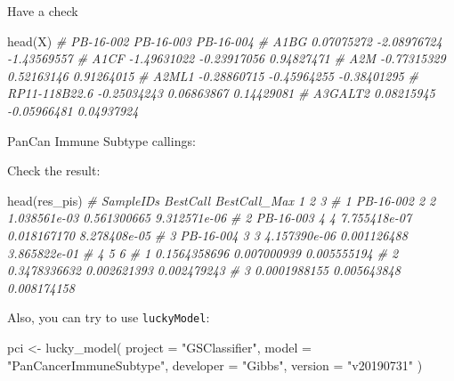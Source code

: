 \documentclass[
  12pt,
]{book}
\newenvironment{Shaded}{\begin{snugshade}}{\end{snugshade}}
\newcommand{\AttributeTok}[1]{\textcolor[rgb]{0.77,0.63,0.00}{#1}}
\newcommand{\CommentTok}[1]{\textcolor[rgb]{0.56,0.35,0.01}{\textit{#1}}}
\newcommand{\FunctionTok}[1]{\textcolor[rgb]{0.00,0.00,0.00}{#1}}
\newcommand{\NormalTok}[1]{#1}
\newcommand{\OtherTok}[1]{\textcolor[rgb]{0.56,0.35,0.01}{#1}}
\newcommand{\StringTok}[1]{\textcolor[rgb]{0.31,0.60,0.02}{#1}}
\begin{document}
Have a check

\begin{Shaded}
\begin{Highlighting}[]
\FunctionTok{head}\NormalTok{(X)}
\CommentTok{\#                 PB{-}16{-}002   PB{-}16{-}003   PB{-}16{-}004}
\CommentTok{\# A1BG           0.07075272 {-}2.08976724 {-}1.43569557}
\CommentTok{\# A1CF          {-}1.49631022 {-}0.23917056  0.94827471}
\CommentTok{\# A2M           {-}0.77315329  0.52163146  0.91264015}
\CommentTok{\# A2ML1         {-}0.28860715 {-}0.45964255 {-}0.38401295}
\CommentTok{\# RP11{-}118B22.6 {-}0.25034243  0.06863867  0.14429081}
\CommentTok{\# A3GALT2        0.08215945 {-}0.05966481  0.04937924}
\end{Highlighting}
\end{Shaded}

PanCan Immune Subtype callings:

Check the result:

\begin{Shaded}
\begin{Highlighting}[]
\FunctionTok{head}\NormalTok{(res\_pis)}
\CommentTok{\#   SampleIDs BestCall BestCall\_Max            1           2            3}
\CommentTok{\# 1 PB{-}16{-}002        2            2 1.038561e{-}03 0.561300665 9.312571e{-}06}
\CommentTok{\# 2 PB{-}16{-}003        4            4 7.755418e{-}07 0.018167170 8.278408e{-}05}
\CommentTok{\# 3 PB{-}16{-}004        3            3 4.157390e{-}06 0.001126488 3.865822e{-}01}
\CommentTok{\#              4           5           6}
\CommentTok{\# 1 0.1564358696 0.007000939 0.005555194}
\CommentTok{\# 2 0.3478336632 0.002621393 0.002479243}
\CommentTok{\# 3 0.0001988155 0.005643848 0.008174158}
\end{Highlighting}
\end{Shaded}

Also, you can try to use \texttt{luckyModel}:

\begin{Shaded}
\begin{Highlighting}[]
\NormalTok{pci }\OtherTok{\textless{}{-}} \FunctionTok{lucky\_model}\NormalTok{(}
  \AttributeTok{project =} \StringTok{"GSClassifier"}\NormalTok{,}
  \AttributeTok{model =} \StringTok{"PanCancerImmuneSubtype"}\NormalTok{,}
  \AttributeTok{developer =} \StringTok{"Gibbs"}\NormalTok{,}
  \AttributeTok{version =} \StringTok{"v20190731"}
\NormalTok{)}
\end{Highlighting}
\end{Shaded}
\end{document}
